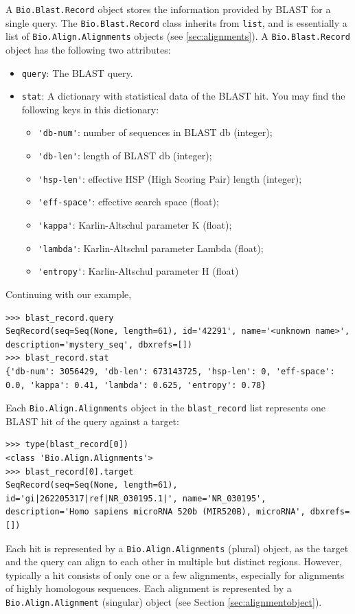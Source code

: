 A \verb|Bio.Blast.Record| object stores the information provided by BLAST for a single query. The \verb|Bio.Blast.Record| class inherits from \verb+list+, and is essentially a list of \verb|Bio.Align.Alignments| objects (see \ref{sec:alignments}). A \verb|Bio.Blast.Record| object has the following two attributes:
\begin{itemize}
\item \verb|query|: The BLAST query.
\item \verb|stat|: A dictionary with statistical data of the BLAST hit. You may find the following keys in this dictionary:
\begin{itemize}
\item \verb|'db-num'|: number of sequences in BLAST db (integer);
\item \verb|'db-len'|: length of BLAST db (integer);
\item \verb|'hsp-len'|: effective HSP (High Scoring Pair) length (integer);
\item \verb|'eff-space'|: effective search space (float);
\item \verb|'kappa'|: Karlin-Altschul parameter K (float);
\item \verb|'lambda'|: Karlin-Altschul parameter Lambda (float);
\item \verb|'entropy'|: Karlin-Altschul parameter H (float)
\end{itemize}
\end{itemize}
Continuing with our example,
\begin{verbatim}
>>> blast_record.query
SeqRecord(seq=Seq(None, length=61), id='42291', name='<unknown name>', description='mystery_seq', dbxrefs=[])
>>> blast_record.stat
{'db-num': 3056429, 'db-len': 673143725, 'hsp-len': 0, 'eff-space': 0.0, 'kappa': 0.41, 'lambda': 0.625, 'entropy': 0.78}
\end{verbatim}
Each \verb|Bio.Align.Alignments| object in the \verb|blast_record| list represents one BLAST hit of the query against a target:
\begin{verbatim}
>>> type(blast_record[0])
<class 'Bio.Align.Alignments'>
>>> blast_record[0].target
SeqRecord(seq=Seq(None, length=61), id='gi|262205317|ref|NR_030195.1|', name='NR_030195', description='Homo sapiens microRNA 520b (MIR520B), microRNA', dbxrefs=[])
\end{verbatim}
Each hit is represented by a \verb|Bio.Align.Alignments| (plural) object, as the target and the query can align to each other in multiple but distinct regions.
However, typically a hit consists of only one or a few alignments, especially for alignments of highly homologous sequences. Each alignment is represented by a  \verb|Bio.Align.Alignment| (singular) object (see Section \ref{sec:alignmentobject}).
